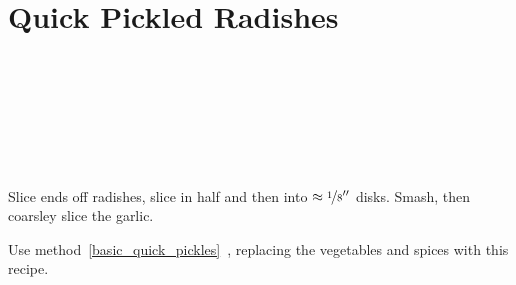 \section[Pickled Radishes]{Quick Pickled Radishes}\label{pickled_radishes}


\begin{ingredientcolumns}[1]
	\begin{ingredientblock}
		\\
		\\
		\\
		\\
		\\
		\\
	\end{ingredientblock}
\end{ingredientcolumns}


\begin{preparation}
\item Slice ends off radishes, slice in half and then into $\approx \nicefrac{1}{8}''$ disks.
	Smash, then coarsley slice the garlic.

\item Use method~\ref{basic_quick_pickles}~, replacing the vegetables and spices with this recipe.
\end{preparation}


\recipeend%
